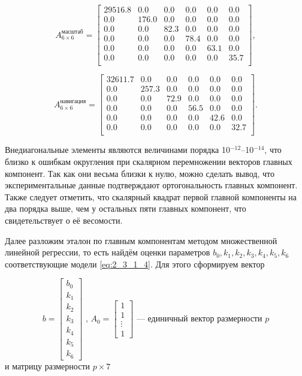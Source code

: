 \begin{equation} \label{eq:3_3_1_6}
A_{6 \times 6}^{\text{масштаб}} =
\begin{bmatrix}
29516.8	& 0.0	& 0.0	& 0.0	& 0.0	& 0.0	\\
0.0		& 176.0	& 0.0	& 0.0	& 0.0	& 0.0	\\
0.0		& 0.0	& 82.3	& 0.0	& 0.0	& 0.0	\\
0.0		& 0.0	& 0.0	& 78.4	& 0.0	& 0.0	\\
0.0		& 0.0	& 0.0	& 0.0	& 63.1	& 0.0	\\
0.0		& 0.0	& 0.0	& 0.0	& 0.0	& 35.7	\\
\end{bmatrix},
\end{equation}

\begin{equation} \label{eq:3_3_1_7}
A_{6 \times 6}^{\text{навигация}} =
\begin{bmatrix}
32611.7	& 0.0	& 0.0	& 0.0	& 0.0	& 0.0	\\
0.0		& 257.3	& 0.0	& 0.0	& 0.0	& 0.0	\\
0.0		& 0.0	& 72.9	& 0.0	& 0.0	& 0.0	\\
0.0		& 0.0	& 0.0	& 56.5	& 0.0	& 0.0	\\
0.0		& 0.0	& 0.0	& 0.0	& 42.6	& 0.0	\\
0.0		& 0.0	& 0.0	& 0.0	& 0.0	& 32.7	\\
\end{bmatrix}.
\end{equation}

Внедиагональные элементы являются величинами порядка 10$^{-12}$--10$^{-14}$, что близко к ошибкам округления при скалярном перемножении векторов главных компонент.
Так как они весьма близки к нулю, можно сделать вывод, что экспериментальные данные подтверждают ортогональность главных компонент.
Также следует отметить, что скалярный квадрат первой главной компоненты на два порядка выше, чем у остальных пяти главных компонент, что свидетельствует о её весомости.

Далее разложим эталон по главным компонентам методом множественной линейной регрессии, то есть найдём оценки параметров $b_0, k_1, k_2, k_3, k_4, k_5, k_6$ соответствующие модели \eqref{eq:2_3_1_4}.	
Для этого сформируем вектор 

\begin{equation}
b = \begin{bmatrix} b_0 \\ k_1 \\ k_2 \\ k_3 \\ k_4 \\ k_5 \\ k_6 \end{bmatrix} \text{ , }
A_0 = \begin{bmatrix} 1 \\ 1 \\ \vdots \\ 1 \end{bmatrix} \text{ --- единичный вектор размерности } p
\end{equation}
и матрицу размерности $p \times 7$


